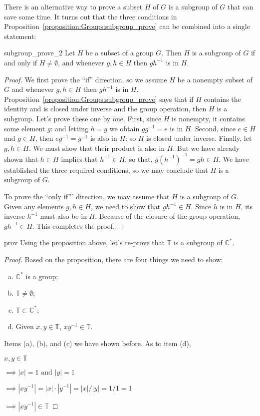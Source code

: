 There is an alternative way to prove a subset $H$ of $G$ is a subgroup of $G$ that  can save some time.  It turns out that the three conditions in Proposition~\ref{proposition:Groups:subgroup_prove} can be combined into a single statement:

\begin{prop}{subgroup_prove_2}
Let $H$ be a subset of a group $G$.  Then $H$ is a subgroup of $G$ if and only if $H \neq \emptyset$, and whenever $g, h \in H$ then $gh^{-1}$ is in $H$. 
\end{prop}
 
 
\begin{proof}
We first prove the ``if'' direction, so we assume $H$ be a nonempty subset of $G$ and whenever $g, h \in H$ then $gh^{-1}$ is in $H$. Proposition~\ref{proposition:Groups:subgroup_prove} says that if $H$ contains the identity and is closed under inverse and the group operation, then $H$ is a subgroup. Let's prove these one by one. First, since $H$ is nonempty, it contains some element $g$: and letting $h=g$ we obtain $gg^{-1} = e$ is in $H$.  Second, since $e \in H$ and  $g \in H$, then $eg^{-1} = g^{-1}$ is also in $H$: so $H$ is closed under inverse.  Finally, let $g, h \in H$. We must show that their product is also in $H$.  But we have already shown that $h \in H$ implies that $h^{-1} \in H$, so that, $g(h^{-1})^{-1} = gh \in H$.  We have established the three required conditions, so we may conclude that  $H$ is a subgroup of $G$.

To prove the ``only  if''' direction, we may assume that $H$ is a subgroup of $G$. Given any elements $g, h \in H$, we need to show that $gh^{-1} \in H$.  Since $h$ is in $H$, its inverse $h^{-1}$ must also be in $H$.  Because of the closure of the group operation, $gh^{-1} \in H$. This completes the proof. 
\end{proof}

\begin{example}{prov}
Using the proposition above, let's re-prove that ${\mathbb T}$ is a subgroup of ${\mathbb C}^{\ast}$.

\begin{proof}
Based on the proposition, there are four things we need to show:
\begin{enumerate}[(a)]
\item
${\mathbb C}^{\ast}$ is a group; 
\item
${\mathbb T} \neq \emptyset$; 
\item
${\mathbb T} \subset {\mathbb C}^{\ast}$; 
\item
Given $x, y \in {\mathbb T}$, $xy^{-1} \in {\mathbb T}$.
\end{enumerate}

\noindent
Items (a), (b), and (c) we have shown before. As to item (d), 

$x, y \in {\mathbb T}$

$\implies |x|=1 \mbox{ and } |y|=1$

$\implies |xy^{-1}|= |x|\cdot|y^{-1}| = |x|/|y| = 1/1 = 1$

$\implies |xy^{-1}| \in {\mathbb T}$

\end{proof}
\end{example} 

